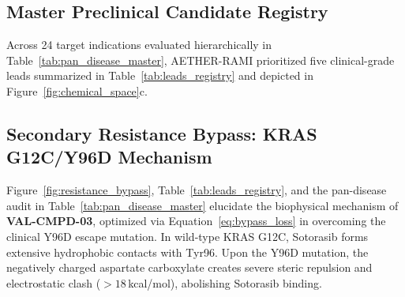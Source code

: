 \subsection{Master Preclinical Candidate Registry}
Across 24 target indications evaluated hierarchically in Table~\ref{tab:pan_disease_master}, AETHER-RAMI prioritized five clinical-grade leads summarized in Table~\ref{tab:leads_registry} and depicted in Figure~\ref{fig:chemical_space}c.

\begin{table}[t]
\caption{Master Preclinical Candidate Leads Registry Across High-Priority Indications}
\label{tab:leads_registry}
\centering
\small
{}
\end{table}

\subsection{Secondary Resistance Bypass: KRAS G12C/Y96D Mechanism}
Figure~\ref{fig:resistance_bypass}, Table~\ref{tab:leads_registry}, and the pan-disease audit in Table~\ref{tab:pan_disease_master} elucidate the biophysical mechanism of \textbf{VAL-CMPD-03}, optimized via Equation~\eqref{eq:bypass_loss} in overcoming the clinical Y96D escape mutation. In wild-type KRAS G12C, Sotorasib forms extensive hydrophobic contacts with Tyr96. Upon the Y96D mutation, the negatively charged aspartate carboxylate creates severe steric repulsion and electrostatic clash ($>18$\,kcal/mol), abolishing Sotorasib binding.

